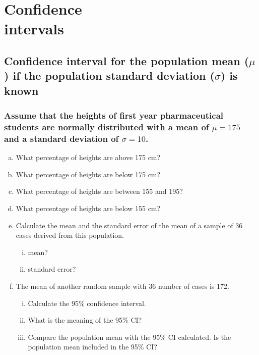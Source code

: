 \chapter[Confidence intervals]{Confidence\\ intervals}
\section[Confidence interval for the population mean if the population SD is known]{
Confidence interval for the population mean ($\mu$) if the population standard deviation ($\sigma$) is known}

\subsection{Assume that the heights of first year pharmaceutical students are normally distributed with a mean of $\mu = 175$ and a standard deviation of $\sigma=10$.}

\begin{enumerate}[a)]
\item What percentage of heights are above 175 cm? 	\hrulefill
\item What percentage of heights are below 175 cm? 	\hrulefill
\item What percentage of heights are between 155 and 195? 	\hrulefill
\item What percentage of heights are below 155 cm? 	 \hrulefill
\item Calculate the mean and the standard error of the mean of a sample of 36 cases derived from this population.

	\begin{enumerate}[i)]
	\item mean? \hrulefill
	\item standard error? \hrulefill
	\end{enumerate}

\item The mean of another random sample with 36 number of cases is 172. 
	\begin{enumerate}[i)]
	\item Calculate the 95\% confidence interval.  \hrulefill
	\item What is the meaning of the 95\% CI? \hrulefill
	\item Compare the population mean with the 95\% CI calculated. 
		Is the population mean included in the 95\% CI? \hrulefill
	\end{enumerate}
\end{enumerate}


